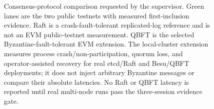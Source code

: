\begin{figure}[!t]
\caption{Consensus-protocol comparison requested by the supervisor. Green lanes
are the two public testnets with measured first-inclusion evidence. Raft is a
crash-fault-tolerant replicated-log reference and is not an EVM public-testnet
measurement. QBFT is the selected Byzantine-fault-tolerant EVM extension.
{The local-cluster extension measures process crash/non-participation, quorum
loss, and operator-assisted recovery for real etcd/Raft and Besu/QBFT
deployments; it does not
inject arbitrary Byzantine messages or compare their absolute latencies.}
{No Raft or QBFT latency is reported until real multi-node runs pass the
three-session evidence gate.}}
\label{fig:consensus-protocols}
\end{figure}
